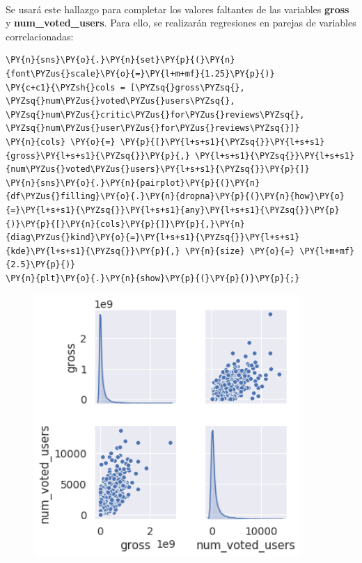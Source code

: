     { \hspace*{\fill} \\}
    
    Se usará este hallazgo para completar los valores faltantes de las
variables \textbf{gross} y \textbf{num\_voted\_users}. Para ello, se
realizarán regresiones en parejas de variables correlacionadas:

    \begin{tcolorbox}[breakable, size=fbox, boxrule=1pt, pad at break*=1mm,colback=cellbackground, colframe=cellborder]
\begin{Verbatim}[commandchars=\\\{\}]
\PY{n}{sns}\PY{o}{.}\PY{n}{set}\PY{p}{(}\PY{n}{font\PYZus{}scale}\PY{o}{=}\PY{l+m+mf}{1.25}\PY{p}{)}
\PY{c+c1}{\PYZsh{}cols = [\PYZsq{}gross\PYZsq{}, \PYZsq{}num\PYZus{}voted\PYZus{}users\PYZsq{}, \PYZsq{}num\PYZus{}critic\PYZus{}for\PYZus{}reviews\PYZsq{}, \PYZsq{}num\PYZus{}user\PYZus{}for\PYZus{}reviews\PYZsq{}]}
\PY{n}{cols} \PY{o}{=} \PY{p}{[}\PY{l+s+s1}{\PYZsq{}}\PY{l+s+s1}{gross}\PY{l+s+s1}{\PYZsq{}}\PY{p}{,} \PY{l+s+s1}{\PYZsq{}}\PY{l+s+s1}{num\PYZus{}voted\PYZus{}users}\PY{l+s+s1}{\PYZsq{}}\PY{p}{]}
\PY{n}{sns}\PY{o}{.}\PY{n}{pairplot}\PY{p}{(}\PY{n}{df\PYZus{}filling}\PY{o}{.}\PY{n}{dropna}\PY{p}{(}\PY{n}{how}\PY{o}{=}\PY{l+s+s1}{\PYZsq{}}\PY{l+s+s1}{any}\PY{l+s+s1}{\PYZsq{}}\PY{p}{)}\PY{p}{[}\PY{n}{cols}\PY{p}{]}\PY{p}{,}\PY{n}{diag\PYZus{}kind}\PY{o}{=}\PY{l+s+s1}{\PYZsq{}}\PY{l+s+s1}{kde}\PY{l+s+s1}{\PYZsq{}}\PY{p}{,} \PY{n}{size} \PY{o}{=} \PY{l+m+mf}{2.5}\PY{p}{)}
\PY{n}{plt}\PY{o}{.}\PY{n}{show}\PY{p}{(}\PY{p}{)}\PY{p}{;}
\end{Verbatim}
\end{tcolorbox}
\begin{figure}[h]
    \centering
    \captionsetup{width=10cm}
    \includegraphics[height=10cm]{./contenido/imagenes/output_85_0.png}
\end{figure}

